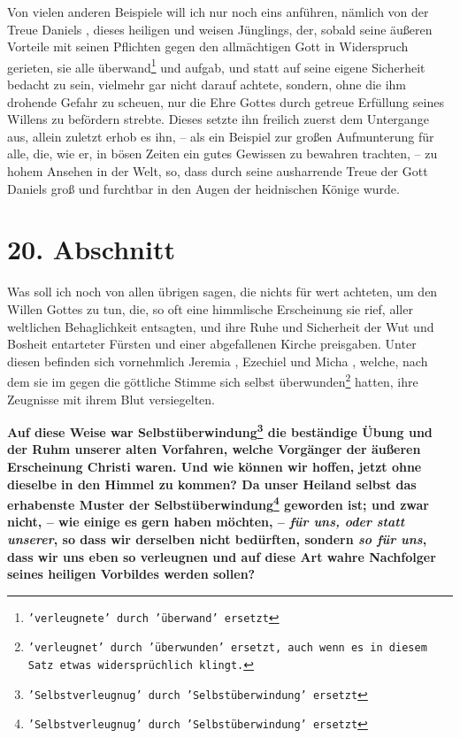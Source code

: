 Von vielen anderen Beispiele will ich nur noch eins anführen, nämlich von der
Treue Daniels , dieses heiligen
 und
weisen Jünglings, der, sobald seine äußeren
Vorteile mit seinen Pflichten gegen den allmächtigen Gott in Widerspruch
gerieten, sie alle überwand\footnote{\texttt{'verleugnete' durch 'überwand'
ersetzt}} und aufgab, und statt auf seine eigene
Sicherheit bedacht zu sein, vielmehr gar nicht darauf achtete, sondern, ohne die
ihm drohende Gefahr zu scheuen, nur die Ehre Gottes durch getreue Erfüllung
seines Willens zu befördern strebte. Dieses setzte ihn freilich zuerst dem
Untergange aus, allein zuletzt erhob es ihn, -- als ein Beispiel zur großen
Aufmunterung für alle, die, wie er, in bösen Zeiten ein gutes Gewissen zu
bewahren trachten, -- zu hohem Ansehen in der Welt, so, dass durch seine
ausharrende Treue der Gott Daniels groß und furchtbar in den Augen der
heidnischen Könige wurde.

\section{20. Abschnitt} \label{kap4_ab20}

Was soll ich noch von allen übrigen sagen, die nichts für wert achteten, um den
Willen Gottes zu tun, die, so oft eine himmlische Erscheinung sie rief, aller
weltlichen Behaglichkeit entsagten, und ihre Ruhe und Sicherheit der Wut und
Bosheit entarteter Fürsten und einer abgefallenen Kirche
preisgaben. Unter
diesen befinden sich vornehmlich Jeremia , Ezechiel
 und Micha , welche, nach dem
sie im gegen die göttliche Stimme sich selbst
überwunden\footnote{\texttt{'verleugnet' durch 'überwunden' ersetzt, auch wenn
es in diesem Satz
etwas widersprüchlich klingt.}} hatten, ihre Zeugnisse
mit ihrem Blut versiegelten.

\medskip

\label{ref:04_20_opfertod}
  \textbf{Auf diese Weise war
Selbstüberwindung\footnote{\texttt{'Selbstverleugnug' durch 'Selbstüberwindung'
ersetzt}}
die beständige Übung und der Ruhm
unserer alten Vorfahren, welche Vorgänger der äußeren Erscheinung Christi waren.
Und wie können wir hoffen, jetzt ohne dieselbe in den Himmel
 zu kommen? Da
unser Heiland selbst das erhabenste Muster der
Selbstüberwindung\footnote{\texttt{'Selbstverleugnug'
durch 'Selbstüberwindung' ersetzt}} geworden ist;
und zwar nicht, -- wie einige es gern haben möchten, -- \textit{für uns, oder
statt
unserer}, so dass wir derselben nicht bedürften, sondern \textit{so für uns},
dass
wir uns eben so verleugnen und auf diese Art wahre Nachfolger seines heiligen
Vorbildes werden sollen?}

